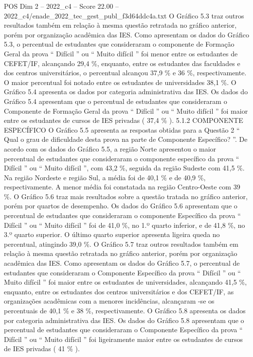 \begin{textsample}{POS Dim 2 – 2022\_c4 – Score 22.00 – 2022\_c4/enade\_2022\_tec\_gest\_publ\_f3d64ddc4a.txt}
O Gráfico 5.3 traz outros resultados também em relação à mesma questão retratada no gráfico anterior, porém por organização acadêmica das IES.
Como apresentam os dados do Gráfico 5.3, o percentual de estudantes que consideraram o componente de Formação Geral da prova “ Difícil ” ou “ Muito difícil ” foi menor entre os estudantes de CEFET/IF, alcançando 29,4 \%, enquanto, entre os estudantes das faculdades e dos centros universitários, o percentual alcançou 37,9 \% e 36 \%, respectivamente.
O maior percentual foi notado entre os estudantes de universidades 38,1 \%.
O Gráfico 5.4 apresenta os dados por categoria administrativa das IES.
Os dados do Gráfico 5.4 apresentam que o percentual de estudantes que consideraram o Componente de Formação Geral da prova “ Difícil ” ou “ Muito difícil ” foi maior entre os estudantes de cursos de IES privadas ( 37,4 \% ). 5.1.2 COMPONENTE ESPECÍFICO O Gráfico 5.5 apresenta as respostas obtidas para a Questão 2 “ Qual o grau de dificuldade desta prova na parte de Componente Específico? ”.
De acordo com os dados do Gráfico 5.5, a região Norte apresentou o maior percentual de estudantes que consideraram o componente específico da prova “ Difícil ” ou “ Muito difícil ”, com 43,2 \%, seguida da região Sudeste com 41,5 \%.
Na região Nordeste e região Sul, a média foi de 40,1 \% e de 40,9 \%, respectivamente.
A menor média foi constatada na região Centro-Oeste com 39 \%.
O Gráfico 5.6 traz mais resultados sobre a questão tratada no gráfico anterior, porém por quartos de desempenho.
Os dados do Gráfico 5.6 apresentam que o percentual de estudantes que consideraram o componente Específico da prova “ Difícil ” ou “ Muito difícil ” foi de 41,0 \%, no 1.º quarto inferior, e de 41,8 \%, no 3.º quarto superior.
O último quarto superior apresenta ligeira queda no percentual, atingindo 39,0 \%.
O Gráfico 5.7 traz outros resultados também em relação à mesma questão retratada no gráfico anterior, porém por organização acadêmica das IES.
Como apresentam os dados do Gráfico 5.7, o percentual de estudantes que consideraram o Componente Específico da prova “ Difícil ” ou “ Muito difícil ” foi maior entre os estudantes de universidades, alcançando 41,5 \%, enquanto, entre os estudantes dos centros universitários e dos CEFET/IF, as organizações acadêmicas com a menores incidências, alcançaram -se os percentuais de 40,1 \% e 38 \%, respectivamente.
O Gráfico 5.8 apresenta os dados por categoria administrativa das IES.
Os dados do Gráfico 5.8 apresentam que o percentual de estudantes que consideraram o Componente Específico da prova “ Difícil ” ou “ Muito difícil ” foi ligeiramente maior entre os estudantes de cursos de IES privadas ( 41 \% ).

\end{textsample}
